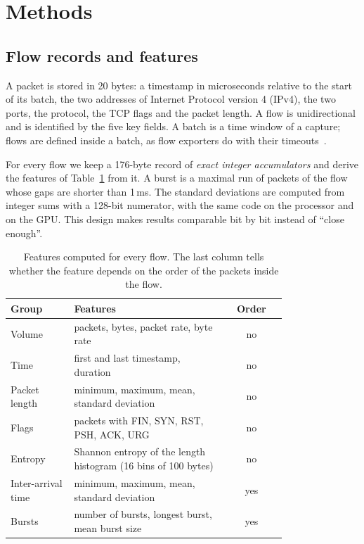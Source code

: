 \section{Methods}

\subsection{Flow records and features}
A packet is stored in 20 bytes: a timestamp in microseconds relative to the
start of its batch, the two addresses of Internet Protocol version 4 (IPv4),
the two ports, the protocol, the TCP flags and the packet length. A flow is
unidirectional and is identified by the five key fields. A batch is a time
window of a capture; flows are defined inside a batch, as flow exporters do
with their timeouts~\cite{netflow}.

For every flow we keep a 176-byte record of \emph{exact integer accumulators}
and derive the \nfeat{} features of Table~\ref{tab:features} from it. A burst
is a maximal run of packets of the flow whose gaps are shorter than
1\,ms. The standard deviations are computed from integer sums with a 128-bit
numerator, with the same code on the processor and on the GPU. This design
makes results comparable bit by bit instead of ``close enough''.

\begin{table}[H]
\centering\footnotesize
\caption{Features computed for every flow. The last column tells whether the
feature depends on the order of the packets inside the flow.}\label{tab:features}
\begin{tabular}{@{}p{0.23\linewidth}p{0.55\linewidth}c@{}}
\toprule
Group & Features & Order \\
\midrule
Volume & packets, bytes, packet rate, byte rate & no \\
Time & first and last timestamp, duration & no \\
Packet length & minimum, maximum, mean, standard deviation & no \\
Flags & packets with FIN, SYN, RST, PSH, ACK, URG & no \\
Entropy & Shannon entropy of the length histogram (16 bins of 100 bytes) & no \\
Inter-arrival time & minimum, maximum, mean, standard deviation & yes \\
Bursts & number of bursts, longest burst, mean burst size & yes \\
\bottomrule
\end{tabular}
\end{table}

